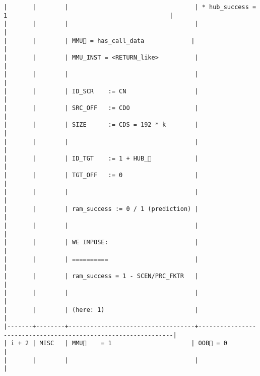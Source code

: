 \documentclass[varwidth=\maxdimen,margin=0.5cm,multi={verbatim}]{standalone}
\begin{document}
\begin{verbatim}
|       |        |                                   | * hub_success = 1                                             |
|       |        |                                   |                                                               |
|       |        | MMU🏴 = has_call_data             |                                                               |
|       |        | MMU_INST = <RETURN_like>          |                                                               |
|       |        |                                   |                                                               |
|       |        | ID_SCR    := CN                   |                                                               |
|       |        | SRC_OFF   := CDO                  |                                                               |
|       |        | SIZE      := CDS = 192 * k        |                                                               |
|       |        |                                   |                                                               |
|       |        | ID_TGT    := 1 + HUB_            |                                                               |
|       |        | TGT_OFF   := 0                    |                                                               |
|       |        |                                   |                                                               |
|       |        | ram_success := 0 / 1 (prediction) |                                                               |
|       |        |                                   |                                                               |
|       |        | WE IMPOSE:                        |                                                               |
|       |        | ==========                        |                                                               |
|       |        | ram_success = 1 - SCEN/PRC_FKTR   |                                                               |
|       |        |                                   |                                                               |
|       |        | (here: 1)                         |                                                               |
|-------+--------+-----------------------------------+---------------------------------------------------------------|
| i + 2 | MISC   | MMU🏴    = 1                      | OOB🏴 = 0                                                     |
|       |        |                                   |                                                               |

\end{verbatim}
\end{document}

